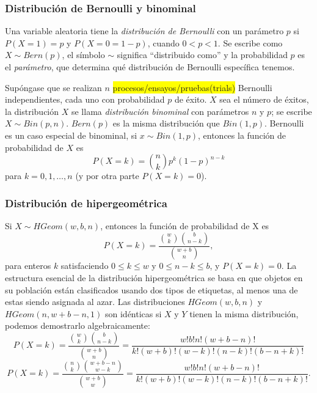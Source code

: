 \documentclass[12pt,letterpaper]{article}
\begin{document}
\subsubsection {Distribución de Bernoulli y binominal}
Una variable aleatoria tiene la \emph{distribución de Bernoulli} con un parámetro $p$ si $P(X=1)=p$ y $P(X=0=1-p)$, cuando $0<p<1$. Se escribe como $X \sim Bern(p)$, el símbolo $\sim$ significa ``distribuido como'' y la probabilidad $p$ es el \emph{parámetro}, que determina qué distribución de Bernoulli específica tenemos.

Supóngase que se realizan $n$ \colorbox{yellow}{procesos/ensayos/pruebas(trials)} Bernoulli independientes, cada uno con probabilidad $p$ de éxito. $X$ sea el número de éxitos, la distribución $X$ se llama \emph{distribución binominal} con parámetros $n$ y $p$; se escribe $X \sim Bin(p,n)$.
$Bern(p)$ es la misma distribución que $Bin(1,p)$. Bernoulli es un caso especial de binominal, si $x \sim Bin(1,p)$, entonces la función de probabilidad de $X$ es
\begin{equation}
P(X=k)=\binom{n}{k}p^k(1-p)^{n-k}
\end{equation}
para $k=0,1,\ldots,n$ (y por otra parte $P(X=k)=0$). 
\subsubsection {Distribución de hipergeométrica}
Si $X \sim HGeom(w,b,n)$, entonces la función de probabilidad de X es
\begin{equation}
P(X=k)=\frac{\binom{w}{k}\binom{b}{n-k}}{\binom{w+b}{n}},
\end{equation}
para enteros $k$ satisfaciendo $0\leq k\leq w$ y $0\leq n-k\leq b$, y $P(X=k)=0$. La estructura esencial de la distribución hipergeométrica se basa en que objetos en su población están clasificados usando dos tipos de etiquetas, al menos una de estas siendo asignada al azar.
Las distribuciones $HGeom(w,b,n)$ y $HGeom(n,w+b-n,1)$ son idénticas si $X$ y $Y$ tienen la misma distribución, podemos demostrarlo algebraicamente:
\begin{equation}
P(X=k)=\frac{\binom{w}{k}\binom{b}{n-k}}{\binom{w+b}{n}}=\frac{w!b!n!(w+b-n)!}{k!(w+b)!(w-k)!(n-k)!(b-n+k)!}
\end{equation}
\begin{equation}
P(X=k)=\frac{\binom{n}{k}\binom{w+b-n}{w-k}}{\binom{w+b}{w}}=\frac{w!b!n!(w+b-n)!}{k!(w+b)!(w-k)!(n-k)!(b-n+k)!}.
\end{equation}%
\end{document}
